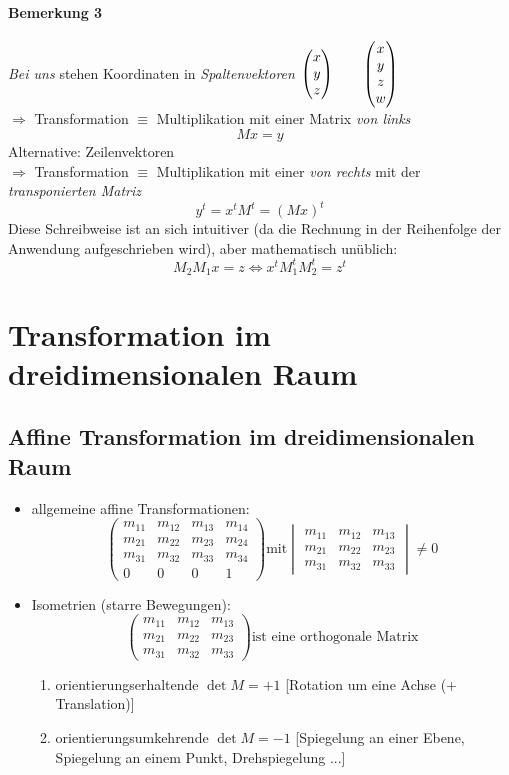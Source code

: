 \paragraph*{Bemerkung 3} \emph{Bei uns} stehen Koordinaten in \emph{Spaltenvektoren}
		$\begin{pmatrix}x\\y\\z\end{pmatrix} \qquad \begin{pmatrix}x\\y\\z\\w\end{pmatrix}$\\
		$\Rightarrow$ Transformation $\equiv$ Multiplikation mit einer Matrix \emph{von links}
		\[M x = y\]
Alternative: Zeilenvektoren\\
		$\Rightarrow$ Transformation $\equiv$ Multiplikation mit einer \emph{von rechts} mit der
		\emph{transponierten Matriz}
		\[y^t = x^t M^t = (M x)^t\]
Diese Schreibweise ist an sich intuitiver (da die Rechnung in der Reihenfolge der Anwendung aufgeschrieben wird),
aber mathematisch unüblich:
	\[M_2 M_1 x = z \Longleftrightarrow x^t M_1^t M_2^t = z^t \]


\section{Transformation im dreidimensionalen Raum}
\subsection{Affine Transformation im dreidimensionalen Raum}
\begin{itemize}
 \item allgemeine affine Transformationen:
	\[
		\begin{pmatrix}
		 m_{11} & m_{12} & m_{13} & m_{14} \\
		 m_{21} & m_{22} & m_{23} & m_{24} \\
		 m_{31} & m_{32} & m_{33} & m_{34} \\
		 0 & 0 & 0 & 1
		\end{pmatrix}
		\text{mit}
		\begin{vmatrix}
		 m_{11} & m_{12} & m_{13} \\
		 m_{21} & m_{22} & m_{23} \\
		 m_{31} & m_{32} & m_{33} 
		\end{vmatrix} \neq 0
	\]
\item Isometrien (starre Bewegungen):
	\[
	 \begin{pmatrix}
		 m_{11} & m_{12} & m_{13} \\
		 m_{21} & m_{22} & m_{23} \\
		 m_{31} & m_{32} & m_{33}
	 \end{pmatrix} \text{ist eine orthogonale Matrix}
	\]
	\begin{enumerate}
	 \renewcommand{\labelenumi}{\alph{enumi})}
	 \item orientierungserhaltende $\det M = +1$ [Rotation um eine Achse (+ Translation)]
	 \item orientierungsumkehrende $\det M = -1$ [Spiegelung an einer Ebene, Spiegelung an einem Punkt,
				Drehspiegelung ...]
	\end{enumerate}
\end{itemize}
